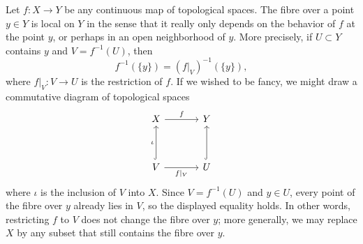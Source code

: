 \documentclass[Notebook.tex]{subfiles}
\begin{document}
Let $f:X \to Y$ be any continuous map of topological spaces. The fibre over a point $y \in Y$ is local on $Y$ in the sense that it really only depends on the behavior of $f$ at the point $y$, or perhaps in an open neighborhood of $y$. More precisely, if $U \subset Y$ contains $y$ and $V=f^{-1}(U)$, then
\[
f^{-1}(\{y\}) = (f|_{V})^{-1}(\{y\}),
\]
where $f|_{V}:V \to U$ is the restriction of $f$. If we wished to be fancy, we might draw a commutative diagram of topological spaces
\[
\begin{tikzcd}[row sep = 3.5em, column sep =3.5em]
    X \arrow[r, "f"] & Y \\
    V \arrow[u, hookrightarrow, "\iota"] \arrow[r, swap,"f|_{V}"] & U \arrow[u, hookrightarrow]
\end{tikzcd}
\]
where $\iota$ is the inclusion of $V$ into $X$. Since $V=f^{-1}(U)$ and $y\in U$, every point of the fibre over $y$ already lies in $V$, so the displayed equality holds. In other words, restricting $f$ to $V$ does not change the fibre over $y$; more generally, we may replace $X$ by any subset that still contains the fibre over $y$.
\end{document}
